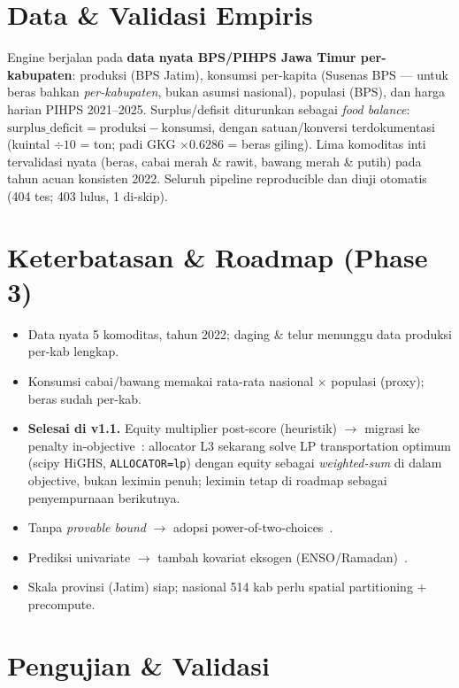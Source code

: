 \documentclass[11pt,a4paper]{article}
\newcommand{\code}[1]{\texttt{#1}}
\begin{document}
\section{Data \& Validasi Empiris}
Engine berjalan pada \textbf{data nyata BPS/PIHPS Jawa Timur per-kabupaten}: produksi
(BPS Jatim), konsumsi per-kapita (Susenas BPS --- untuk beras bahkan \emph{per-kabupaten}, bukan
asumsi nasional), populasi (BPS), dan harga harian PIHPS 2021--2025. Surplus/defisit diturunkan
sebagai \emph{food balance}: $\text{surplus\_deficit} = \text{produksi} - \text{konsumsi}$, dengan
satuan/konversi terdokumentasi (kuintal $\div 10$ = ton; padi GKG $\times 0.6286$ = beras giling).
Lima komoditas inti tervalidasi nyata (beras, cabai merah \& rawit, bawang merah \& putih) pada
tahun acuan konsisten 2022. Seluruh pipeline reproducible dan diuji otomatis (404 tes; 403 lulus, 1 di-skip).

\section{Keterbatasan \& Roadmap (Phase 3)}
\begin{itemize}
  \item Data nyata 5 komoditas, tahun 2022; daging \& telur menunggu data produksi per-kab lengkap.
  \item Konsumsi cabai/bawang memakai rata-rata nasional $\times$ populasi (proxy); beras sudah per-kab.
  \item \textbf{Selesai di v1.1.} Equity multiplier post-score (heuristik) $\rightarrow$ migrasi ke
        penalty in-objective~\cite{firouz2021,hakimifar2022}: allocator L3 sekarang solve LP
        transportation optimum (scipy HiGHS, \code{ALLOCATOR=lp}) dengan equity sebagai
        \emph{weighted-sum} di dalam objective, bukan leximin penuh; leximin tetap di roadmap
        sebagai penyempurnaan berikutnya.
  \item Tanpa \emph{provable bound} $\rightarrow$ adopsi power-of-two-choices~\cite{diaby2024}.
  \item Prediksi univariate $\rightarrow$ tambah kovariat eksogen (ENSO/Ramadan)~\cite{alanshari2025,chronosx2025}.
  \item Skala provinsi (Jatim) siap; nasional 514 kab perlu spatial partitioning + precompute.
\end{itemize}

\section{Pengujian \& Validasi}
\label{sec:pengujian}
\end{document}
